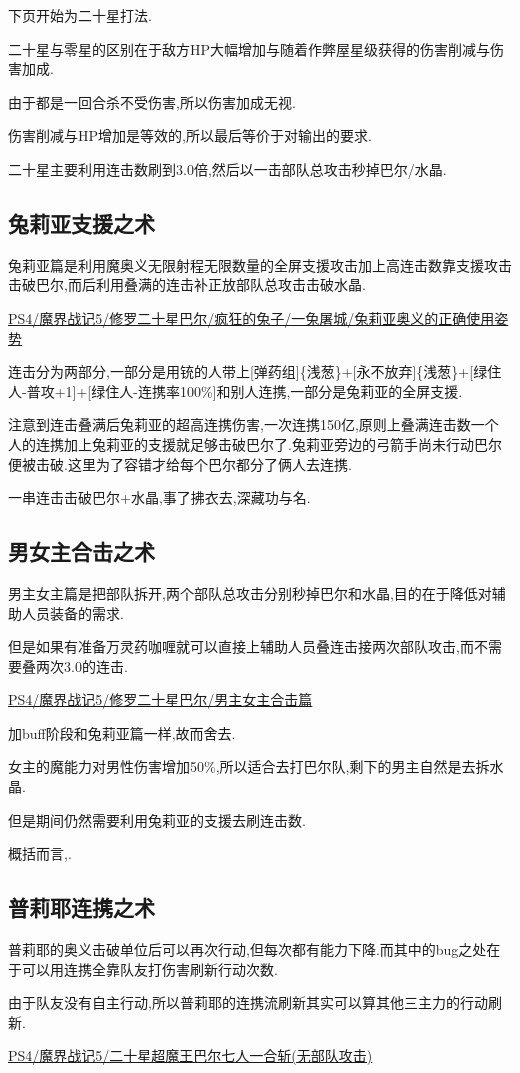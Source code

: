 	下页开始为二十星打法.

	二十星与零星的区别在于敌方HP大幅增加与随着作弊屋星级获得的伤害削减与伤害加成.

	由于都是一回合杀不受伤害,所以伤害加成无视.

	伤害削减与HP增加是等效的,所以最后等价于对输出的要求.

	二十星主要利用连击数刷到3.0倍,然后以一击部队总攻击秒掉巴尔/水晶.

	{\color{red}{如果准备了大概200个万灵药做的咖喱可以不需要装备就达到20亿血,简化辅助人员的需求}}

	\newpage

	\subsection{兔莉亚支援之术}

	兔莉亚篇是利用魔奥义无限射程无限数量的全屏支援攻击加上高连击数靠支援攻击击破巴尔,而后利用叠满的连击补正放部队总攻击击破水晶.

	\href{http://www.bilibili.com/video/av2989748/}{PS4/魔界战记5/修罗二十星巴尔/疯狂的兔子/一兔屠城/兔莉亚奥义的正确使用姿势}


	连击分为两部分,一部分是用铳的人带上[弹药组]\{浅葱\}+[永不放弃]\{浅葱\}+[绿住人-普攻+1]+[绿住人-连携率100\%]和别人连携,一部分是兔莉亚的全屏支援.

	注意到连击叠满后兔莉亚的超高连携伤害,一次连携150亿,原则上叠满连击数一个人的连携加上兔莉亚的支援就足够击破巴尔了.兔莉亚旁边的弓箭手尚未行动巴尔便被击破.这里为了容错才给每个巴尔都分了俩人去连携.

	一串连击击破巴尔+水晶,事了拂衣去,深藏功与名.

	\subsection{男女主合击之术}

	男主女主篇是把部队拆开,两个部队总攻击分别秒掉巴尔和水晶,目的在于降低对辅助人员装备的需求.

	但是如果有准备万灵药咖喱就可以直接上辅助人员叠连击接两次部队攻击,而不需要叠两次3.0的连击.
	
	\href{http://www.bilibili.com/video/av2995573/}{PS4/魔界战记5/修罗二十星巴尔/男主女主合击篇}

	加buff阶段和兔莉亚篇一样,故而舍去.

	女主的魔能力对男性伤害增加50\%,所以适合去打巴尔队,剩下的男主自然是去拆水晶.

	但是期间仍然需要利用兔莉亚的支援去刷连击数.

	概括而言,{\color{red}{这两个二十星是利用连击+部队总攻击}}.

	\newpage

	\subsection{普莉耶连携之术}

	普莉耶的奥义击破单位后可以再次行动,但每次都有能力下降.而其中的bug之处在于可以用连携全靠队友打伤害刷新行动次数.

	由于队友没有自主行动,所以普莉耶的连携流刷新其实可以算其他三主力的行动刷新.

	\href{http://www.bilibili.com/video/av3480159/}{ PS4/魔界战记5/二十星超魔王巴尔七人一合斩(无部队攻击)}

	